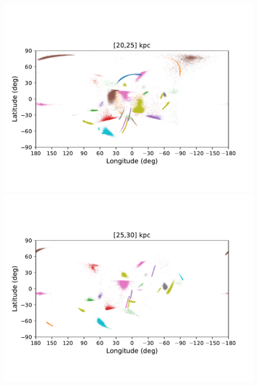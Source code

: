     \twocolumn
    \begin{figure}[h!]
        \begin{center}
            \includegraphics[clip=true, trim = 0mm 15mm 0mm 20mm, width=0.9\columnwidth]{images/PII_ensemble_LB_D20-25_scatter.pdf}
            \includegraphics[clip=true, trim = 0mm 15mm 0mm 20mm, width=0.9\columnwidth]{images/PII_ensemble_LB_D25-30_scatter.pdf}


\end{center}
\end{figure}
